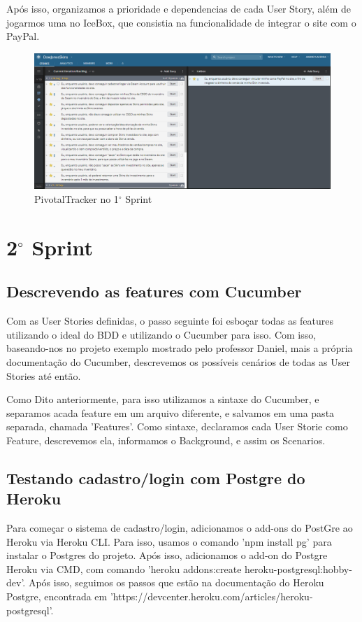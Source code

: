    Após isso, organizamos a prioridade e dependencias de cada User Story, além de jogarmos uma no IceBox, que 
    consistia na funcionalidade de integrar o site com o PayPal.\\
    \begin{figure}[!htb]
        \centering
        \includegraphics[scale=0.4]{Imagens/Pivotal1.png}
        \caption{PivotalTracker no 1$^{\circ}$ Sprint}
    \end{figure}

    \section{2$^{\circ}$ Sprint}
    \subsection{Descrevendo as features com Cucumber}
    Com as User Stories definidas, o passo seguinte foi esboçar todas as features utilizando o ideal do BDD 
    e utilizando o Cucumber para isso. Com isso, baseando-nos no projeto exemplo mostrado pelo professor Daniel, 
    mais a própria documentação do Cucumber, descrevemos os possíveis cenários de todas as User Stories até então.
    
    Como Dito anteriormente, para isso utilizamos a sintaxe do Cucumber, e separamos acada feature em um arquivo diferente, 
    e salvamos em uma pasta separada, chamada 'Features'. 
    Como sintaxe, declaramos cada User Storie como Feature, descrevemos ela, informamos o Background, e assim os Scenarios.

    \subsection{Testando cadastro/login com Postgre do Heroku}
    Para começar o sistema de cadastro/login, adicionamos o add-ons do PostGre ao Heroku via Heroku CLI. Para isso, 
    usamos o comando 'npm install pg' para instalar o Postgres do projeto. Após isso, adicionamos o add-on do Postgre 
    Heroku via CMD, com comando 'heroku addons:create heroku-postgresql:hobby-dev'. Após isso, seguimos os passos 
    que estão na documentação do Heroku Postgre, encontrada em 'https://devcenter.heroku.com/articles/heroku-postgresql'.

